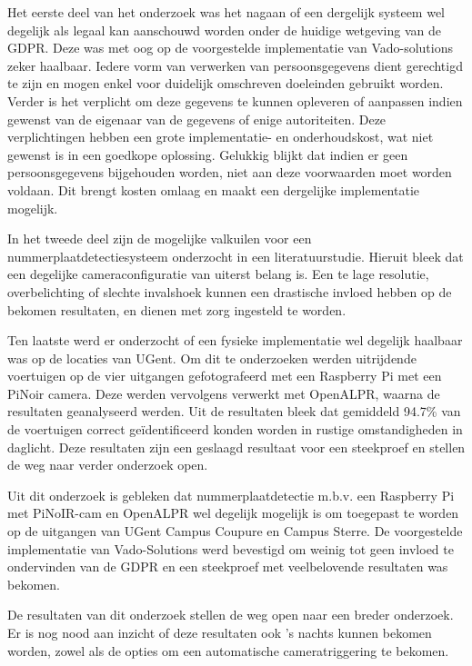 Het eerste deel van het onderzoek was het nagaan of een dergelijk systeem wel degelijk als legaal kan aanschouwd worden onder de huidige wetgeving van de GDPR. Deze was met oog op de voorgestelde implementatie van Vado-solutions zeker haalbaar. Iedere vorm van verwerken van persoonsgegevens dient gerechtigd te zijn en mogen enkel voor duidelijk omschreven doeleinden gebruikt worden. Verder is het verplicht om deze gegevens te kunnen opleveren of aanpassen indien gewenst van de eigenaar van de gegevens of enige autoriteiten. Deze verplichtingen hebben een grote implementatie- en onderhoudskost, wat niet gewenst is in een goedkope oplossing. Gelukkig blijkt dat indien er geen persoonsgegevens bijgehouden worden, niet aan deze voorwaarden moet worden voldaan. Dit brengt kosten omlaag en maakt een dergelijke implementatie mogelijk.

In het tweede deel zijn de mogelijke valkuilen voor een nummerplaatdetectiesysteem onderzocht in een literatuurstudie. Hieruit bleek dat een degelijke cameraconfiguratie van uiterst belang is. Een te lage resolutie, overbelichting of slechte invalshoek kunnen een drastische invloed hebben op de bekomen resultaten, en dienen met zorg ingesteld te worden.

Ten laatste werd er onderzocht of een fysieke implementatie wel degelijk haalbaar was op de locaties van UGent. Om dit te onderzoeken werden uitrijdende voertuigen op de vier uitgangen gefotografeerd met een Raspberry Pi met een PiNoir camera. Deze werden vervolgens verwerkt met OpenALPR, waarna de resultaten geanalyseerd werden. Uit de resultaten bleek dat gemiddeld 94.7\% van de voertuigen correct geïdentificeerd konden worden in rustige omstandigheden in daglicht. Deze resultaten zijn een geslaagd resultaat voor een steekproef en stellen de weg naar verder onderzoek open.

Uit dit onderzoek is gebleken dat nummerplaatdetectie m.b.v. een Raspberry Pi met PiNoIR-cam en OpenALPR wel degelijk mogelijk is om toegepast te worden op de uitgangen van UGent Campus Coupure en Campus Sterre. De voorgestelde implementatie van Vado-Solutions werd bevestigd om weinig tot geen invloed te ondervinden van de GDPR en een steekproef met veelbelovende resultaten was bekomen.

De resultaten van dit onderzoek stellen de weg open naar een breder onderzoek. Er is nog nood aan inzicht of deze resultaten ook 's nachts kunnen bekomen worden, zowel als de opties om een automatische cameratriggering te bekomen.
